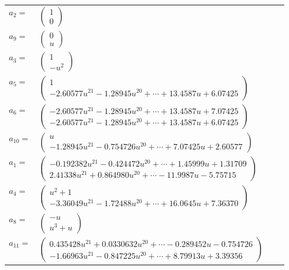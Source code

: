 \documentclass[1p]{elsarticle_modified}
\theoremstyle{definition}
\begin{document}
\begin{tabular}{m{7pt} m{180pt} m{7pt} m{180pt} }
\flushright $a_{2}=$&$\begin{pmatrix}1\\0\end{pmatrix}$ \\
\flushright $a_{9}=$&$\begin{pmatrix}0\\u\end{pmatrix}$ \\
\flushright $a_{3}=$&$\begin{pmatrix}1\\- u^2\end{pmatrix}$ \\
\flushright $a_{5}=$&$\begin{pmatrix}1\\-2.60577 u^{21}-1.28945 u^{20}+\cdots+13.4587 u+6.07425\end{pmatrix}$ \\
\flushright $a_{6}=$&$\begin{pmatrix}-2.60577 u^{21}-1.28945 u^{20}+\cdots+13.4587 u+7.07425\\-2.60577 u^{21}-1.28945 u^{20}+\cdots+13.4587 u+6.07425\end{pmatrix}$ \\
\flushright $a_{10}=$&$\begin{pmatrix}u\\-1.28945 u^{21}-0.754726 u^{20}+\cdots+7.07425 u+2.60577\end{pmatrix}$ \\
\flushright $a_{1}=$&$\begin{pmatrix}-0.192382 u^{21}-0.424472 u^{20}+\cdots+1.45999 u+1.31709\\2.41338 u^{21}+0.864980 u^{20}+\cdots-11.9987 u-5.75715\end{pmatrix}$ \\
\flushright $a_{4}=$&$\begin{pmatrix}u^2+1\\-3.36049 u^{21}-1.72488 u^{20}+\cdots+16.0645 u+7.36370\end{pmatrix}$ \\
\flushright $a_{8}=$&$\begin{pmatrix}- u\\u^3+u\end{pmatrix}$ \\
\flushright $a_{11}=$&$\begin{pmatrix}0.435428 u^{21}+0.0330632 u^{20}+\cdots-0.289452 u-0.754726\\-1.66963 u^{21}-0.847225 u^{20}+\cdots+8.79913 u+3.39356\end{pmatrix}$ \\

\end{tabular}
\end{document}

